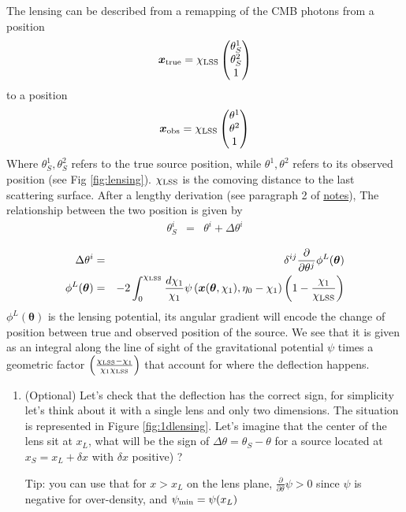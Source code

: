 \documentclass[a4paper, 11pt]{article}
\def\ba{\begin{eqnarray}}
\def\ea{\end{eqnarray}}
\begin{document}
The lensing can be described from a remapping of the CMB photons from a position  
\ba
\bm{x}_{\rm true}  =\chi_{\rm LSS} \begin{pmatrix} 
{\theta}^{1}_{S} \cr
{\theta}^{2}_{S} \cr
 1
 \end{pmatrix} 
\ea
to a position 
\ba
\bm{x}_{\rm obs} = \chi_{\rm LSS}  \begin{pmatrix} 
{\theta}^{1} \cr
{\theta}^{2} \cr
 1
 \end{pmatrix} 
\ea
Where $\theta^{1}_{S}, \theta^{2}_{S}$ refers to the true source position, while  $\theta^{1}, \theta^{2}$ refers to its observed position (see Fig \ref{fig:lensing}).
$\chi_{\rm LSS}$ is the comoving distance to the last scattering surface. After a lengthy derivation (see paragraph 2 of \href{https://github.com/thibautlouis/thibautlouis.github.io/blob/master/derivation.pdf}{notes}), The relationship between the two position is given by
\ba
 \theta^{i}_{S}  &=&   \theta^{i} + \Delta  \theta^{i} \\
\ea
\ba
 \Delta  \theta^{i} &=& \delta^{ij} \frac{\partial }{\partial \theta^{j}} \phi^{L}(\bm{\theta}) \\
  \phi^{L}(\bm{\theta}) &=&  -2 \int^{\chi_{\rm LSS}}_{0} \frac{d\chi_{1}}{\chi_{1}}  \psi \left( \bm{x}(\bm{\theta}, \chi_{1}), \eta_{0}-\chi_{1} \right)  \left(1 - \frac{\chi_{1}}{\chi_{\rm LSS} } \right)
\ea
$  \phi^{L}(\bm{\theta}) $ is the lensing potential, its angular gradient will encode the change of position between true and observed position of the source.
We see that it is given as an integral along the line of sight of the gravitational potential $\psi$ times a geometric factor $ \left( \frac{\chi_{\rm LSS} -\chi_{1}}{\chi_{1}\chi_{\rm LSS} } \right)$ that account for where the deflection happens.
\begin{enumerate}
  \renewcommand{\labelenumi}{(\alph{enumi})}
\item (Optional) Let's check that the deflection has the correct sign, for simplicity let's think about it with a single lens and only two dimensions. The situation is represented in Figure \ref{fig:1dlensing}.
Let's imagine that the center of the lens sit at $x_{L}$, what will be the sign of $\Delta  \theta =  \theta_{S}  - \theta$ for a source located at $x_{S}= x_{L} + \delta x$ with $\delta x$ positive) ?

Tip: you can use that for $x>x_{L}$ on the lens plane,   $\frac{\partial }{\partial \theta} \psi  >0$ since $\psi$ is negative for over-density, and $\psi_{\rm min} = \psi(x_{L})$


\end{enumerate}
\end{document}

